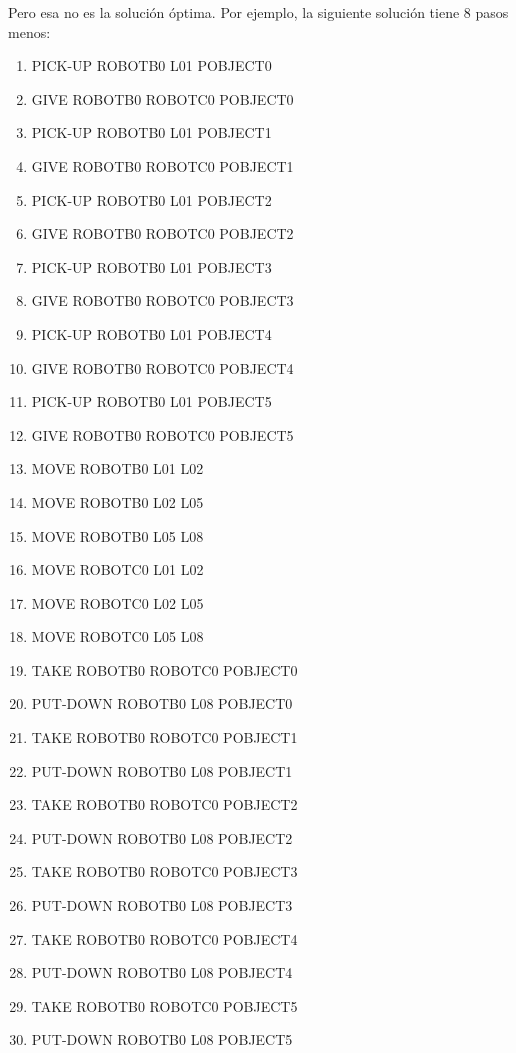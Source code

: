 \documentclass{article}
\begin{document}
Pero esa no es la solución óptima. Por ejemplo, la siguiente solución tiene 8 pasos menos:

\begin{enumerate}
    \item PICK-UP ROBOTB0 L01 POBJECT0
    \item GIVE ROBOTB0 ROBOTC0 POBJECT0
    \item PICK-UP ROBOTB0 L01 POBJECT1
    \item GIVE ROBOTB0 ROBOTC0 POBJECT1
    \item PICK-UP ROBOTB0 L01 POBJECT2
    \item GIVE ROBOTB0 ROBOTC0 POBJECT2
    \item PICK-UP ROBOTB0 L01 POBJECT3
    \item GIVE ROBOTB0 ROBOTC0 POBJECT3
    \item PICK-UP ROBOTB0 L01 POBJECT4
    \item GIVE ROBOTB0 ROBOTC0 POBJECT4
    \item PICK-UP ROBOTB0 L01 POBJECT5
    \item GIVE ROBOTB0 ROBOTC0 POBJECT5
    \item MOVE ROBOTB0 L01 L02
    \item MOVE ROBOTB0 L02 L05
    \item MOVE ROBOTB0 L05 L08
    \item MOVE ROBOTC0 L01 L02
    \item MOVE ROBOTC0 L02 L05
    \item MOVE ROBOTC0 L05 L08
    \item TAKE ROBOTB0 ROBOTC0 POBJECT0
    \item PUT-DOWN ROBOTB0 L08 POBJECT0
    \item TAKE ROBOTB0 ROBOTC0 POBJECT1
    \item PUT-DOWN ROBOTB0 L08 POBJECT1
    \item TAKE ROBOTB0 ROBOTC0 POBJECT2
    \item PUT-DOWN ROBOTB0 L08 POBJECT2
    \item TAKE ROBOTB0 ROBOTC0 POBJECT3
    \item PUT-DOWN ROBOTB0 L08 POBJECT3
    \item TAKE ROBOTB0 ROBOTC0 POBJECT4
    \item PUT-DOWN ROBOTB0 L08 POBJECT4
    \item TAKE ROBOTB0 ROBOTC0 POBJECT5
    \item PUT-DOWN ROBOTB0 L08 POBJECT5
\end{enumerate}
\end{document}
